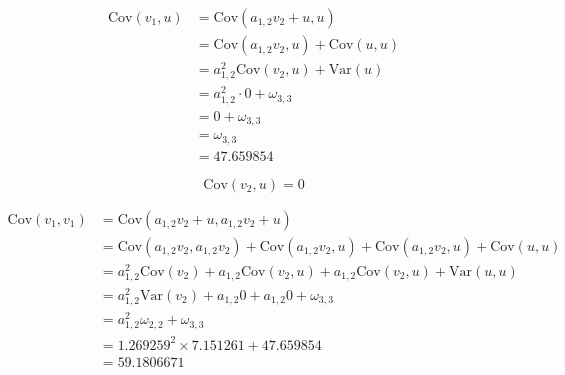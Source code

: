 \documentclass[
]{book}
\begin{document}
\begin{equation}
  \begin{split}
    \mathrm{Cov}
    \left(
      v_1,
      u 
    \right)
    &=
    \mathrm{Cov}
    \left(
      a_{1, 2} v_2 + u,
      u 
    \right) \\
    &=
    \mathrm{Cov}
    \left(
      a_{1, 2} v_2, u
    \right)
    +
    \mathrm{Cov}
    \left(
      u, u
    \right) \\
    &=
    a_{1, 2}^{2}
    \mathrm{Cov}
    \left(
      v_2, u
    \right)
    +
    \mathrm{Var}
    \left(
      u
    \right) \\
    &=
    a_{1, 2}^{2}
    \cdot
    0
    +
    \omega_{3, 3} \\
    &=
    0
    +
    \omega_{3, 3} \\
    &=
    \omega_{3, 3} \\
    &=
    47.659854
  \end{split}
\end{equation}

\begin{equation}
  \mathrm{Cov}
  \left(
    v_2,
    u 
  \right)
  =
  0
\end{equation}

\begin{equation}
  \begin{split}
    \mathrm{Cov} \left( v_1, v_1 \right)
    &=
    \mathrm{Cov}
    \left(
      a_{1, 2} v_2 + u,
      a_{1, 2} v_2 + u 
    \right) \\
    &=
    \mathrm{Cov} \left( a_{1, 2} v_2, a_{1, 2} v_2 \right)
    +
    \mathrm{Cov} \left( a_{1, 2} v_2, u \right)
    +
    \mathrm{Cov} \left( a_{1, 2} v_2, u \right)
    +
    \mathrm{Cov} \left( u, u \right) \\
    &=
    a_{1, 2}^{2} \mathrm{Cov} \left( v_2 \right)
    +
    a_{1, 2} \mathrm{Cov} \left( v_2, u \right)
    +
    a_{1, 2} \mathrm{Cov} \left( v_2, u \right)
    +
    \mathrm{Var} \left( u, u \right) \\
    &=
    a_{1, 2}^{2} \mathrm{Var} \left( v_2 \right)
    +
    a_{1, 2} 0
    +
    a_{1, 2} 0
    +
    \omega_{3, 3} \\
    &=
    a_{1, 2}^{2} \omega_{2, 2} + \omega_{3, 3} \\
    &=
    1.269259^{2} \times 7.151261 + 47.659854 \\
    &=
    59.1806671
  \end{split}
\end{equation}
\end{document}
